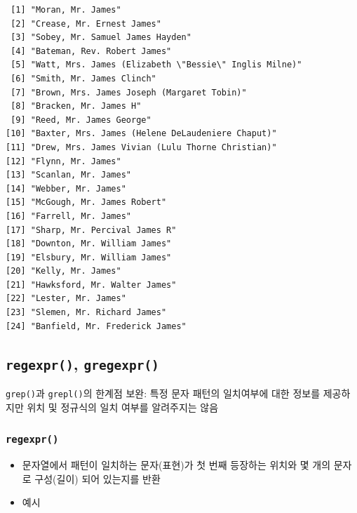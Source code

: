 \documentclass[
  11pt,
]{krantz}
\providecommand{\tightlist}{%
  \setlength{\itemsep}{0pt}\setlength{\parskip}{0pt}}
\begin{document}
\begin{verbatim}
 [1] "Moran, Mr. James"                                    
 [2] "Crease, Mr. Ernest James"                            
 [3] "Sobey, Mr. Samuel James Hayden"                      
 [4] "Bateman, Rev. Robert James"                          
 [5] "Watt, Mrs. James (Elizabeth \"Bessie\" Inglis Milne)"
 [6] "Smith, Mr. James Clinch"                             
 [7] "Brown, Mrs. James Joseph (Margaret Tobin)"           
 [8] "Bracken, Mr. James H"                                
 [9] "Reed, Mr. James George"                              
[10] "Baxter, Mrs. James (Helene DeLaudeniere Chaput)"     
[11] "Drew, Mrs. James Vivian (Lulu Thorne Christian)"     
[12] "Flynn, Mr. James"                                    
[13] "Scanlan, Mr. James"                                  
[14] "Webber, Mr. James"                                   
[15] "McGough, Mr. James Robert"                           
[16] "Farrell, Mr. James"                                  
[17] "Sharp, Mr. Percival James R"                         
[18] "Downton, Mr. William James"                          
[19] "Elsbury, Mr. William James"                          
[20] "Kelly, Mr. James"                                    
[21] "Hawksford, Mr. Walter James"                         
[22] "Lester, Mr. James"                                   
[23] "Slemen, Mr. Richard James"                           
[24] "Banfield, Mr. Frederick James"                       
\end{verbatim}

\normalsize

\hypertarget{regexpr-gregexpr}{%
\subsection{\texorpdfstring{\textbf{\texttt{regexpr()}}, \textbf{\texttt{gregexpr()}}}{regexpr(), gregexpr()}}\label{regexpr-gregexpr}}

\texttt{grep()}과 \texttt{grepl()}의 한계점 보완: 특정 문자 패턴의 일치여부에 대한 정보를 제공하지만 위치 및 정규식의 일치 여부를 알려주지는 않음

\hypertarget{regexpr}{%
\subsubsection*{\texorpdfstring{\textbf{\texttt{regexpr()}}}{regexpr()}}\label{regexpr}}


\begin{itemize}
\tightlist
\item
  문자열에서 패턴이 일치하는 문자(표현)가 첫 번째 등장하는 위치와 몇 개의 문자로 구성(길이) 되어 있는지를 반환
\item
  예시
\end{itemize}
\end{document}
